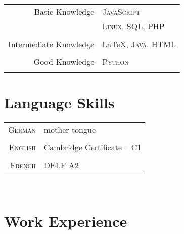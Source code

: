 \documentclass[a4paper,10pt]{article} %
\begin{document}
{\begin{minipage}[t]{0.44\textwidth}
\begin{tabular}{rl}
Basic Knowledge         & \textsc{JavaScript}\\
                        & \textsc{Linux}, \textsc{SQL}, \textsc{PHP}\\ \\
Intermediate Knowledge  & \LaTeX, \textsc{Java}, \textsc{HTML}\\ \\
Good Knowledge          & \textsc{Python}\\ \\
\end{tabular}


\section{Language Skills} 

\begin{tabular}{rl}
\textsc{German}
& mother tongue\\
& \\
\textsc{English}
& Cambridge Certificate – C1\\
& \\
\textsc{French}
& DELF A2 \\
\end{tabular}\\[10pt]

	
\end{minipage} %

\begin{minipage}[t]{0.5\textwidth}
\vspace{0pt} %
	

\section{Work Experience} 


\end{minipage}}
\end{document}
